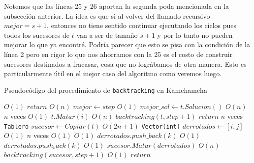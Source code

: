   Notemos que las líneas 25 y 26 aportan la segunda poda mencionada en la subsección anterior. La idea es que si al volver del llamado recursivo $mejor = s+1$, entonces no tiene sentido continuar ejecutando los ciclos pues todos los sucesores de $t$ van a ser de tamaño $s+1$ y por lo tanto no pueden mejorar lo que ya encontré. Podría parecer que esto se pisa con la condición de la línea 2 pero en rigor lo que nos ahorramos con la 25 es el costo de construir sucesores destinados a fracasar, cosa que no lográbamos de otra manera. Esto es particularmente útil en el mejor caso del algoritmo como veremos luego.
  
  \begin{algorithm}[H]
  \begin{algorithmic}[1]
  \label{algo:backtracking}
  \caption{Pseudocódigo del procedimiento de \texttt{backtracking} en Kamehameha}
    \Comment $O(1)$
      \State $return$
    \EndIf
    \Comment $O(n)$
      \State $mejor \gets step$
      \Comment $O(1)$
      \State $mejor\_sol \gets t.Solucion()$
      \Comment $O(n)$
    \Else
      \For {$i \in [0,..., n),$ $t.EstaVivo?(i)$}
      \Comment $n$ veces
        \Comment $O(1)$
          \State $t.Matar(i)$
          \Comment $O(n)$
          \State $backtracking(t, step+1)$
          \State $return$
        \EndIf
        \For {$j \in [0,..., n),$ $j \neq i \land t.EstaVivo?(j)$}
          \Comment $n$ veces
          \State \texttt{Tablero} $sucesor \gets Copiar(t)$
          \Comment $O(2n+1)$
          \State \texttt{Vector(int)} $derrotados \gets [i, j]$
          \Comment $O(1)$ 
          \For {$k \in [0,..., n),$ $k \neq i \land k \neq j \land t.EstaVivo?(k)$}
          \Comment $n$ veces
            \Comment $O(1)$
              \Comment $O(1)$
                \State $derrotados.push\_back(k)$ 
                \Comment $O(1)$ \footnotemark
              \EndIf
            \Else 
              \normalsize
                \State $derrotados.push_back(k)$
                \Comment $O(1)$
              \EndIf
            \EndIf
          \EndFor
          \State $sucesor.Matar(derrotados)$
          \Comment $O(n)$
          \State $backtracking(sucesor, step+1)$
            \Comment $O(1)$
            \State $return$
          \EndIf
        \EndFor
      \EndFor
    \EndIf
    \EndProcedure
  \end{algorithmic}
  \end{algorithm}

